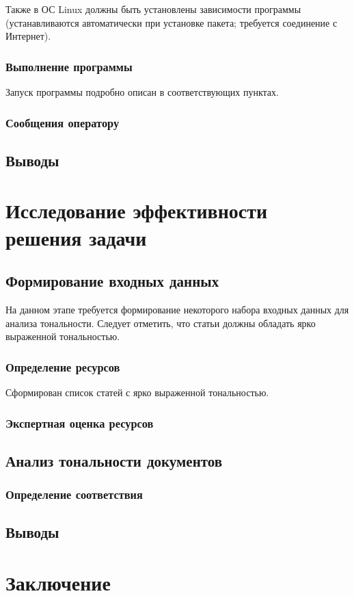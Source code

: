\documentclass[a4paper,14pt,russian]{extreport}
\begin{document}
Также в ОС Linux должны быть установлены зависимости программы (устанавливаются автоматически при установке пакета; требуется соединение с Интернет).
\subsection{Выполнение программы}

Запуск программы подробно описан в соответствующих пунктах.
\subsection{Сообщения оператору}
\section{Выводы}
\newpage
\chapter{Исследование эффективности решения задачи}

\section{Формирование входных данных}

На данном этапе требуется формирование некоторого набора входных данных для анализа тональности. Следует отметить, что статьи должны обладать ярко выраженной тональностью.

\subsection{Определение ресурсов}
Сформирован список статей с ярко выраженной тональностью.

\subsection{Экспертная оценка ресурсов}

\section{Анализ тональности документов}

\subsection{Определение соответствия}

\section{Выводы}
\newpage
\chapter*{Заключение}
\end{document}

